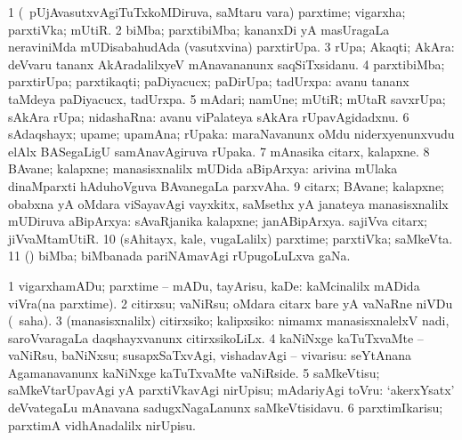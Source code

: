 \bentry
{}
\bmng
{} 
\emng
\eentry

\bentry
{}
\gl{\nA}
\bmng
\bnum
\num{1} (\kanmu\ pUjAvasutxvAgiTuTxkoMDiruva, saMtaru \mo vara) parxtime; vigarxha; parxtiVka; mUtiR. 
\num{2} biMba; parxtibiMba; kananxDi yA masUragaLa neraviniMda mUDisabahudAda (vasutxvina) parxtirUpa. 
\num{3} rUpa; Akaqti; AkAra:  deVvaru tananx AkAradalilxyeV mAnavananunx saqSiTxsidanu. 
\num{4} parxtibiMba; parxtirUpa; parxtikaqti; paDiyacucx; paDirUpa; tadUrxpa:  avanu tananx taMdeya paDiyacucx, tadUrxpa. 
\num{5} mAdari; namUne; mUtiR; mUtaR savxrUpa; sAkAra rUpa; nidashaRna:  avanu viPalateya sAkAra rUpavAgidadxnu. 
\num{6} sAdaqshayx; upame; upamAna; rUpaka:  maraNavanunx oMdu niderxyenunxvudu elAlx BASegaLigU samAnavAgiruva rUpaka. 
\num{7} mAnasika citarx, kalapxne. 
\num{8} BAvane; kalapxne; manasisxnalilx mUDida aBipArxya:  arivina mUlaka dinaMparxti hAduhoVguva BAvanegaLa parxvAha. 
\num{9} citarx; BAvane; kalapxne; obabxna yA oMdara viSayavAgi vayxkitx, saMsethx yA janateya manasisxnalilx mUDiruva aBipArxya:  sAvaRjanika kalapxne; janABipArxya.  sajiVva citarx; jiVvaMtamUtiR. 
\num{10} (sAhitayx, kale, \mo vugaLalilx) parxtime; parxtiVka; saMkeVta. 
\num{11} (\ga) biMba; biMbanada pariNAmavAgi rUpugoLuLxva gaNa. 
\enum
\emng
\eentry

\bentry
{}
\gl{\sakirx}
\bmng
\bnum
\num{1} vigarxhamADu; parxtime -- mADu, tayArisu, kaDe:  kaMcinalilx mADida viVra(na parxtime). 
\num{2} citirxsu; vaNiRsu; oMdara citarx bare yA vaNaRne niVDu (\rUpa\ saha). 
\num{3} (manasisxnalilx) citirxsiko; kalipxsiko:  nimamx manasisxnalelxV nadi, saroVvaragaLa daqshayxvanunx citirxsikoLiLx. 
\num{4} kaNiNxge kaTuTxvaMte -- vaNiRsu, baNiNxsu; susapxSaTxvAgi, vishadavAgi -- vivarisu:  seYtAnana Agamanavanunx kaNiNxge kaTuTxvaMte vaNiRside. 
\num{5} saMkeVtisu; saMkeVtarUpavAgi yA parxtiVkavAgi nirUpisu; mAdariyAgi toVru:  `akerxYsatx' deVvategaLu mAnavana sadugxNagaLanunx saMkeVtisidavu. 
\num{6} parxtimIkarisu; parxtimA vidhAnadalilx nirUpisu. 
\enum
\emng
\eentry

